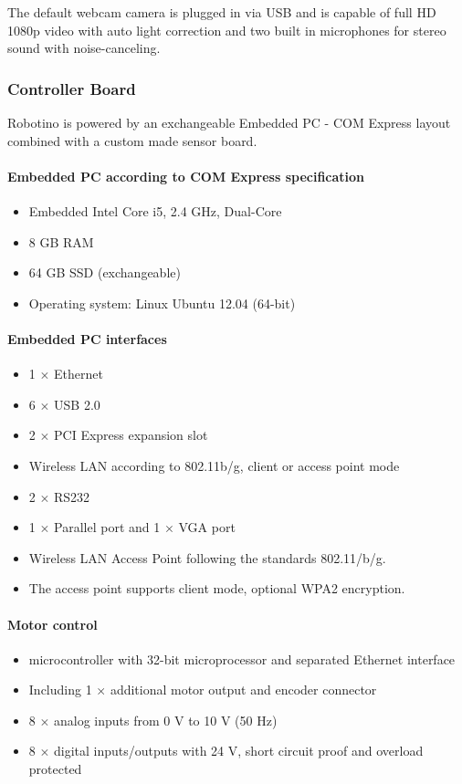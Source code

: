 \documentclass[12pt,twoside]{article}
\begin{document}
\begin{appendix}
The default webcam camera is plugged in via USB and is capable of full
HD 1080p video with auto light correction and two built in microphones
for stereo sound with noise-canceling.

\subsubsection{Controller Board}
Robotino is powered by an exchangeable Embedded PC - COM Express
layout combined with a custom made sensor board.

\paragraph{Embedded PC according to COM Express specification}
\begin{itemize}
\item Embedded Intel Core i5, 2.4 GHz, Dual-Core
\item 8 GB RAM
\item 64 GB SSD (exchangeable) 
\item Operating system: Linux Ubuntu 12.04 (64-bit)
\end{itemize}

\paragraph{Embedded PC interfaces}
\begin{itemize}
\item 1 $\times$ Ethernet
\item 6 $\times$ USB 2.0
\item 2 $\times$ PCI Express expansion slot
\item Wireless LAN according to 802.11b/g, client or access point mode
\item 2 $\times$  RS232
\item 1 $\times$ Parallel port and 1 $\times$ VGA port
\item Wireless LAN Access Point following the standards 802.11/b/g.
\item The access point supports client mode, optional WPA2 encryption.
\end{itemize}

\paragraph{Motor control}
\begin{itemize}
\item microcontroller with 32-bit microprocessor and separated
  Ethernet interface
\item Including 1 $\times$ additional motor output and encoder
  connector
\item 8 $\times$ analog inputs from 0 V to 10 V (50 Hz)
\item 8 $\times$ digital inputs/outputs with 24 V, short circuit proof
  and overload protected
\end{itemize}


\end{appendix}
\end{document}
